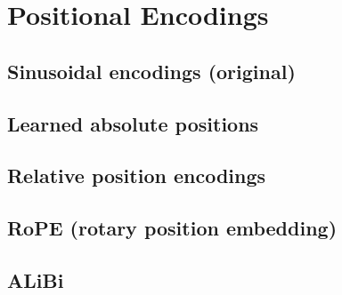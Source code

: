 
\section{Positional Encodings}

\subsection{Sinusoidal encodings (original)}


\subsection{Learned absolute positions}


\subsection{Relative position encodings}


\subsection{RoPE (rotary position embedding)}


\subsection{ALiBi}


